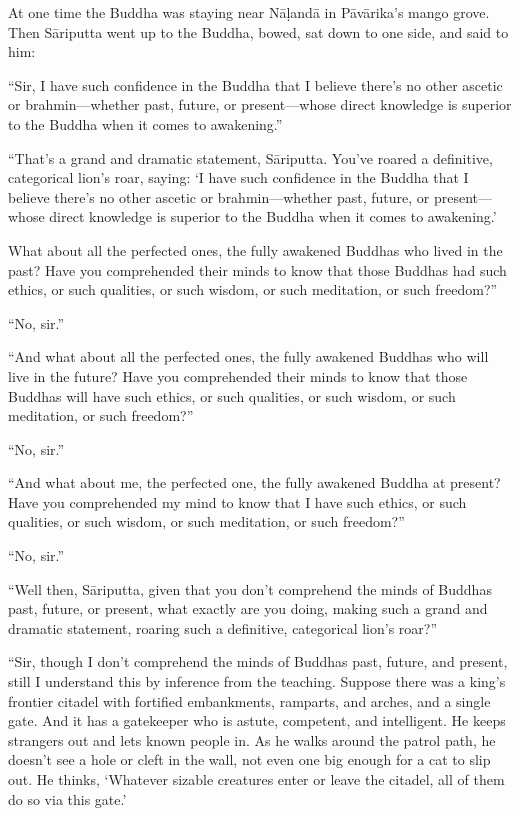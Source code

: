 \documentclass[12pt,openany]{book}%
\begin{document}
At one time the Buddha was staying near \textsanskrit{Nāḷandā} in \textsanskrit{Pāvārika}’s mango grove. Then \textsanskrit{Sāriputta} went up to the Buddha, bowed, sat down to one side, and said to him: 

“Sir, I have such confidence in the Buddha that I believe there’s no other ascetic or brahmin—whether past, future, or present—whose direct knowledge is superior to the Buddha when it comes to awakening.” 

“That’s a grand and dramatic statement, \textsanskrit{Sāriputta}. You’ve roared a definitive, categorical lion’s roar, saying: ‘I have such confidence in the Buddha that I believe there’s no other ascetic or brahmin—whether past, future, or present—whose direct knowledge is superior to the Buddha when it comes to awakening.’ 

What about all the perfected ones, the fully awakened Buddhas who lived in the past? Have you comprehended their minds to know that those Buddhas had such ethics, or such qualities, or such wisdom, or such meditation, or such freedom?” 

“No, sir.” 

“And what about all the perfected ones, the fully awakened Buddhas who will live in the future? Have you comprehended their minds to know that those Buddhas will have such ethics, or such qualities, or such wisdom, or such meditation, or such freedom?” 

“No, sir.” 

“And what about me, the perfected one, the fully awakened Buddha at present? Have you comprehended my mind to know that I have such ethics, or such qualities, or such wisdom, or such meditation, or such freedom?” 

“No, sir.” 

“Well then, \textsanskrit{Sāriputta}, given that you don’t comprehend the minds of Buddhas past, future, or present, what exactly are you doing, making such a grand and dramatic statement, roaring such a definitive, categorical lion’s roar?” 

“Sir, though I don’t comprehend the minds of Buddhas past, future, and present, still I understand this by inference from the teaching. Suppose there was a king’s frontier citadel with fortified embankments, ramparts, and arches, and a single gate. And it has a gatekeeper who is astute, competent, and intelligent. He keeps strangers out and lets known people in. As he walks around the patrol path, he doesn’t see a hole or cleft in the wall, not even one big enough for a cat to slip out. He thinks, ‘Whatever sizable creatures enter or leave the citadel, all of them do so via this gate.’ 
\end{document}
